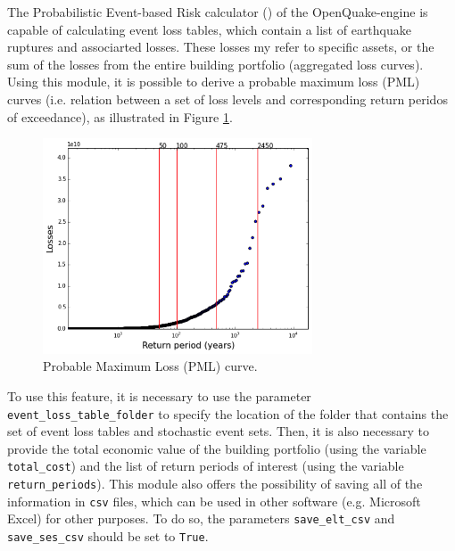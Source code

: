 The Probabilistic Event-based Risk calculator (\citep{SilvaEtAl2014a}) of the OpenQuake-engine is capable of calculating event loss tables, which contain a list of earthquake ruptures and associarted losses. These losses my refer to specific assets, or the sum of the losses from the entire building portfolio (aggregated loss curves). 
Using this module, it is possible to derive a probable maximum loss (PML) curves (i.e. relation between a set of loss levels and corresponding return peridos of exceedance), as illustrated in Figure \ref{fig:pml}.

\begin{figure}[htb]
  \centering
      \includegraphics[width=8cm]{figures/pml_example.png}
  \caption{Probable Maximum Loss (PML) curve.}
  \label{fig:pml}
\end{figure}

To use this feature, it is necessary to use the parameter \verb=event_loss_table_folder= to specify the location of the folder that contains the set of event loss tables and stochastic event sets. Then, it is also necessary to provide the total economic value of the building portfolio (using the variable \verb=total_cost=) and the list of return periods of interest (using the variable \verb=return_periods=). This module also offers the possibility of saving all of the information in \verb=csv= files, which can be used in other software (e.g. Microsoft Excel) for other purposes. To do so, the parameters \verb=save_elt_csv= and \verb=save_ses_csv= should be set to \verb=True=.